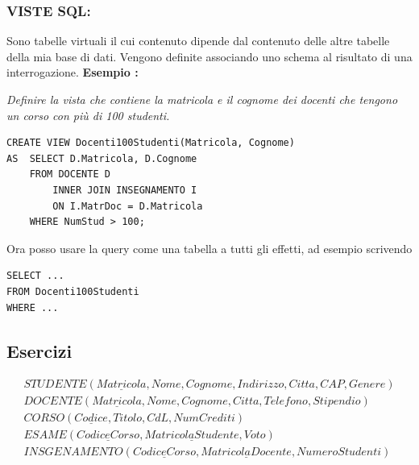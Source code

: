 \documentclass{article}
\newcounter{esempio}
\newenvironment{esempio}{
	\refstepcounter{esempio}%
	\noindent\textbf{Esempio \theesempio:}
}{\par}
\begin{document}
\subsubsection{VISTE SQL:}
Sono tabelle virtuali il cui contenuto dipende dal contenuto delle altre tabelle della mia base di dati. Vengono definite associando uno schema al risultato di una interrogazione.
\begin{esempio}
\textit{Definire la vista che contiene la matricola e il cognome dei docenti che tengono un corso con più di 100 studenti.}
\begin{lstlisting}[style=sqlstyle]
CREATE VIEW Docenti100Studenti(Matricola, Cognome)
AS 	SELECT D.Matricola, D.Cognome
	FROM DOCENTE D
		INNER JOIN INSEGNAMENTO I
		ON I.MatrDoc = D.Matricola
	WHERE NumStud > 100;
\end{lstlisting}
Ora posso usare la query come una tabella a tutti gli effetti, ad esempio scrivendo
\begin{lstlisting}[style=sqlstyle]
SELECT ...
FROM Docenti100Studenti
WHERE ...
\end{lstlisting}
\end{esempio}

\subsection{Esercizi}
\begin{align*}
	STUDENTE(\underline{Matricola},Nome, Cognome, Indirizzo, Citta, CAP, Genere)\\
	DOCENTE(\underline{Matricola},Nome, Cognome, Citta, Telefono, Stipendio)\\
	CORSO(\underline{Codice}, Titolo, CdL, NumCrediti)\\
	ESAME(\underline{CodiceCorso},\underline{MatricolaStudente}, Voto)\\
	INSGENAMENTO(\underline{CodiceCorso},\underline{MatricolaDocente},NumeroStudenti)\\
\end{align*}
\end{document}
